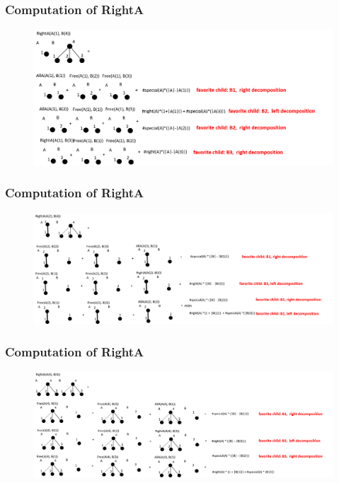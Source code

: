 \documentclass{beamer}
\begin{document}
\begin{frame}
\frametitle{Computation of RightA}
\begin{figure}
	\includegraphics[width=1.0\linewidth]{RightA_1_4}
	\label{RightA_1_4} 
	\centering
\end{figure}

\end{frame}

\begin{frame}
\frametitle{Computation of RightA}
\begin{figure}
	\includegraphics[width=1.0\linewidth]{RightA_2_4}
	\label{RightA_2_4} 
	\centering
\end{figure}

\end{frame}

\begin{frame}
\frametitle{Computation of RightA}
\begin{figure}
	\includegraphics[width=1.0\linewidth]{RightA_4_4}
	\label{RightA_4_4} 
	\centering
\end{figure}

\end{frame}
\end{document}
